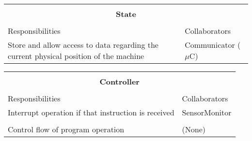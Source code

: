\documentclass[titlepage]{article}
\begin{document}
\begin{table}[!htbp]
\centering
\begin{tabular}{| p{} | p{} |}\hline
	\multicolumn{2}{|l|}{}\\
	\multicolumn{2}{|c|}{\large{\textbf{State}}}\\
	\multicolumn{2}{|l|}{}\\\hline
	\vspace{0mm}\large{Responsibilities}\vspace{2mm} &\vspace{0mm}\large{Collaborators}\vspace{2mm}\\\hline
	\vspace{0mm}Store and allow access to data regarding the current physical position of the machine	&\vspace{0mm}Communicator ($\mu$C)\vspace{2mm}\vspace{2mm}\\\hline
\end{tabular}
\end{table}

\begin{table}[!htbp]
\centering
\begin{tabular}{| p{} | p{} |}\hline
	\multicolumn{2}{|l|}{}\\
	\multicolumn{2}{|c|}{\large{\textbf{Controller}}}\\
	\multicolumn{2}{|l|}{}\\\hline
	\vspace{0mm}\large{Responsibilities}\vspace{2mm} &\vspace{0mm}\large{Collaborators}\vspace{2mm}\\\hline
	\vspace{0mm}Interrupt operation if that instruction is received	&\vspace{0mm}SensorMonitor \\&\\
	Control flow of program operation\vspace{2mm}	&(None)\vspace{2mm}\\\hline
\end{tabular}
\end{table}
\newpage
\end{document}

